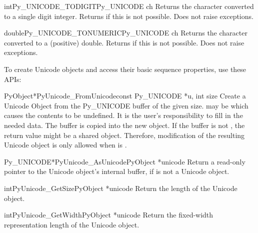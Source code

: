 \begin{cfuncdesc}{int}{Py_UNICODE_TODIGIT}{Py_UNICODE ch}
  Returns the character  converted to a single digit integer.
  Returns  if this is not possible.  Does not raise
  exceptions.
\end{cfuncdesc}

\begin{cfuncdesc}{double}{Py_UNICODE_TONUMERIC}{Py_UNICODE ch}
  Returns the character  converted to a (positive) double.
  Returns  if this is not possible.  Does not raise
  exceptions.
\end{cfuncdesc}


To create Unicode objects and access their basic sequence properties,
use these APIs:

\begin{cfuncdesc}{PyObject*}{PyUnicode_FromUnicode}{const Py_UNICODE *u,
                                                    int size}
  Create a Unicode Object from the Py_UNICODE buffer  of the
  given size.  may be \NULL{} which causes the contents to be
  undefined. It is the user's responsibility to fill in the needed
  data.  The buffer is copied into the new object. If the buffer is
  not \NULL{}, the return value might be a shared object. Therefore,
  modification of the resulting Unicode object is only allowed when
   is \NULL{}.
\end{cfuncdesc}

\begin{cfuncdesc}{Py_UNICODE*}{PyUnicode_AsUnicode}{PyObject *unicode}
  Return a read-only pointer to the Unicode object's internal
   buffer, \NULL{} if  is not a Unicode
  object.
\end{cfuncdesc}

\begin{cfuncdesc}{int}{PyUnicode_GetSize}{PyObject *unicode}
  Return the length of the Unicode object.
\end{cfuncdesc}

\begin{cfuncdesc}{int}{PyUnicode_GetWidth}{PyObject *unicode}
  Return the fixed-width representation length of the Unicode object.
\end{cfuncdesc}

